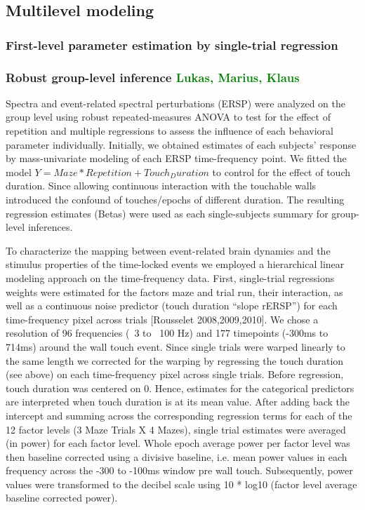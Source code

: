 \subsection{Multilevel modeling}
\subsubsection{First-level parameter estimation by single-trial regression}

\subsubsection{Robust group-level inference \textcolor{green}{Lukas, Marius, Klaus}}

Spectra and event-related spectral perturbations (ERSP\citep{Makeig2004}) were analyzed on the group level using robust repeated-measures ANOVA\citep{Pernet2011} to test for the effect of repetition and multiple regressions to assess the influence of each behavioral parameter individually. Initially, we obtained estimates of each subjects' response by mass-univariate modeling of each ERSP time-frequency point. We fitted the model $Y = Maze*Repetition + Touch_Duration$ to control for the effect of touch duration. Since allowing continuous interaction with the touchable walls introduced the confound of touches/epochs of different duration. The resulting regression estimates (Betas) were used as each single-subjects summary for group-level inferences.

To characterize the mapping between event-related brain dynamics and the stimulus properties of the time-locked events we employed a hierarchical linear modeling approach on the time-frequency data. First, single-trial regressions weights were estimated for the factors maze and trial run, their interaction, as well as a continuous noise predictor (touch duration “slope rERSP”) for each time-frequency pixel across trials [Rousselet 2008,2009,2010]. We chose a resolution of 96 frequencies  (~3 to ~100 Hz) and 177 timepoints (-300ms to 714ms) around the wall touch event. Since single trials were warped linearly to the same length we corrected for the warping by regressing the touch duration (see above) on each time-frequency pixel across single trials. Before regression, touch duration was centered on 0. Hence, estimates for the categorical predictors are interpreted when touch duration is at its mean value. After adding back the intercept and summing across the corresponding regression terms for each of the 12 factor levels (3 Maze Trials X 4 Mazes), single trial estimates were averaged (in power) for each factor level. Whole epoch average power per factor level was then baseline corrected using a divisive baseline, i.e. mean power values in each frequency across the -300 to -100ms window pre wall touch. Subsequently, power values were transformed to the decibel scale using 10 * log10 (factor level average baseline corrected power).

